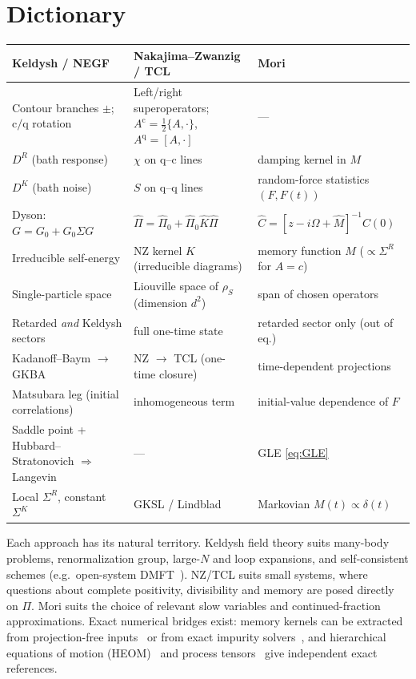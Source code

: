 \documentclass[11pt]{article}
\newcommand{\cl}{\mathrm{c}}
\newcommand{\qu}{\mathrm{q}}
\begin{document}
\section{Dictionary}
\label{sec:dictionary}

\begin{center}
\small
\renewcommand{\arraystretch}{1.25}
\begin{tabularx}{\textwidth}{>{\raggedright\arraybackslash}X>{\raggedright\arraybackslash}X>{\raggedright\arraybackslash}X}
\toprule
\textbf{Keldysh / NEGF} & \textbf{Nakajima--Zwanzig / TCL} & \textbf{Mori} \\
\midrule
Contour branches $\pm$; $\cl/\qu$ rotation & Left/right superoperators; $A^\cl=\frac12\{A,\cdot\}$, $A^\qu=[A,\cdot]$ & --- \\
$D^R$ (bath response) & $\chi$ on $\qu$--$\cl$ lines & damping kernel in $M$ \\
$D^K$ (bath noise) & $S$ on $\qu$--$\qu$ lines & random-force statistics $(F,F(t))$ \\
Dyson: $G=G_0+G_0\Sigma G$ & $\hat\Pi=\hat\Pi_0+\hat\Pi_0\hat K\hat\Pi$ & $\hat C=[z-i\Omega+\hat M]^{-1}C(0)$ \\
Irreducible self-energy & NZ kernel $K$ (irreducible diagrams) & memory function $M$ ($\propto\Sigma^R$ for $A=c$) \\
Single-particle space & Liouville space of $\rho_S$ (dimension $d^2$) & span of chosen operators \\
Retarded \emph{and} Keldysh sectors & full one-time state & retarded sector only (out of eq.) \\
Kadanoff--Baym $\to$ GKBA & NZ $\to$ TCL (one-time closure) & time-dependent projections \\
Matsubara leg (initial correlations) & inhomogeneous term & initial-value dependence of $F$ \\
Saddle point + Hubbard--Stratonovich $\Rightarrow$ Langevin & --- & GLE \eqref{eq:GLE} \\
Local $\Sigma^R$, constant $\Sigma^K$ & GKSL / Lindblad & Markovian $M(t)\propto\delta(t)$ \\
\bottomrule
\end{tabularx}
\end{center}
Each approach has its natural territory. Keldysh field theory suits many-body problems,
renormalization group, large-$N$ and loop expansions, and self-consistent schemes
(e.g.\ open-system DMFT~\cite{Scarlatella2021}). NZ/TCL suits small systems, where
questions about complete positivity, divisibility and memory are posed directly on $\Pi$.
Mori suits the choice of relevant slow variables and continued-fraction approximations.
Exact numerical bridges exist: memory kernels can be extracted from projection-free
inputs~\cite{ShiGeva2003} or from exact impurity solvers~\cite{CohenRabani2011,Kidon2015}, and
hierarchical equations of motion (HEOM)~\cite{Tanimura2020} and process
tensors~\cite{Pollock2018} give independent exact references.
\end{document}

